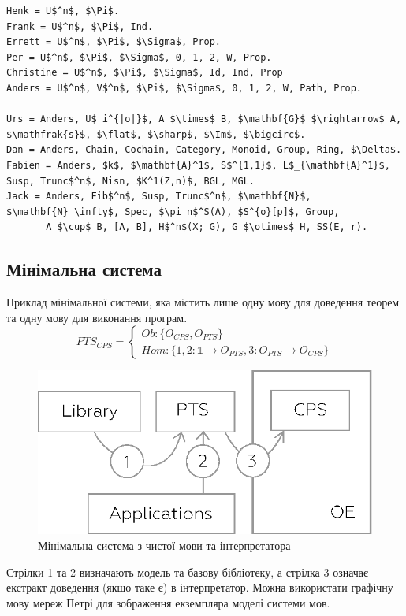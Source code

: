 \begin{lstlisting}
Henk = U$^n$, $\Pi$.
Frank = U$^n$, $\Pi$, Ind.
Errett = U$^n$, $\Pi$, $\Sigma$, Prop.
Per = U$^n$, $\Pi$, $\Sigma$, 0, 1, 2, W, Prop.
Christine = U$^n$, $\Pi$, $\Sigma$, Id, Ind, Prop
Anders = U$^n$, V$^n$, $\Pi$, $\Sigma$, 0, 1, 2, W, Path, Prop.

Urs = Anders, U$_i^{|o|}$, A $\times$ B, $\mathbf{G}$ $\rightarrow$ A, $\mathfrak{s}$, $\flat$, $\sharp$, $\Im$, $\bigcirc$.
Dan = Anders, Chain, Cochain, Category, Monoid, Group, Ring, $\Delta$.
Fabien = Anders, $k$, $\mathbf{A}^1$, S$^{1,1}$, L$_{\mathbf{A}^1}$, Susp, Trunc$^n$, Nisn, $K^1(Z,n)$, BGL, MGL.
Jack = Anders, Fib$^n$, Susp, Trunc$^n$, $\mathbf{N}$, $\mathbf{N}_\infty$, Spec, $\pi_n$^S(A), $S^{o}[p]$, Group,
       A $\cup$ B, [A, B], H$^n$(X; G), G $\otimes$ H, SS(E, r).
\end{lstlisting}

\newpage
\subsection{Мінімальна система}
Приклад мінімальної системи, яка містить лише одну мову для доведення теорем
та одну мову для виконання програм.
\begin{equation}
PTS_{CPS} =
\begin{cases}
Ob: \{ O_{CPS}, O_{PTS} \} \\
Hom: \{ 1,2: \mathbb{1} \rightarrow O_{PTS}, 3: O_{PTS} \rightarrow O_{CPS} \}
\end{cases}
\end{equation}
\begin{center}
\begin{figure}[ht]
  \centerline{\includegraphics[scale=0.6]{minimal.eps}}
  \caption{Мінімальна система з чистої мови та інтерпретатора}
\end{figure}
\end{center}
Стрілки 1 та 2 визначають
модель та базову бібліотеку, а стрілка 3 означає екстракт
доведення (якщо таке є) в інтерпретатор. Можна використати графічну
мову мереж Петрі для зображення екземпляра моделі системи мов.

